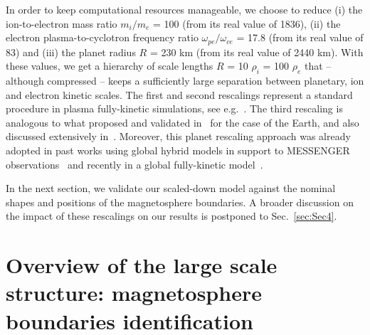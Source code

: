 \documentclass{aa}
\begin{document}
In order to keep computational resources manageable, we choose to reduce (i) the ion-to-electron mass ratio $m_i/m_e$ = 100 (from its real value of 1836), (ii) the electron plasma-to-cyclotron frequency ratio $\omega_{pe}/\omega_{ce}$ = 17.8 (from its real value of 83) and (iii) the planet radius $R$ = 230 km (from its real value of 2440 km).
With these values, we get a hierarchy of scale lengths $R$ = 10 $\rho_i$ = 100 $\rho_e$ that -- although compressed -- keeps a sufficiently large separation between planetary, ion and electron kinetic scales.
The first and second rescalings represent a standard procedure in plasma fully-kinetic simulations, see e.g.~\citet{Bret2010}. The third rescaling is analogous to what proposed and validated in~\citet{Toth2017} for the case of the Earth, and also discussed extensively in~\citet{Markidis2021}.
Moreover, this planet rescaling approach was already adopted in past works using global hybrid models in support to MESSENGER observations~\citep{Travnicek2007,Travnicek2009,Travnicek2010} and recently in a global fully-kinetic model~\citep{Lapenta2022}.

In the next section, we validate our scaled-down model against the nominal shapes and positions of the magnetosphere boundaries. A broader discussion on the impact of these rescalings on our results is postponed to Sec.~\ref{sec:Sec4}.

\section{Overview of the large scale structure: magnetosphere boundaries identification}\label{sec:Results_large}
\end{document}
